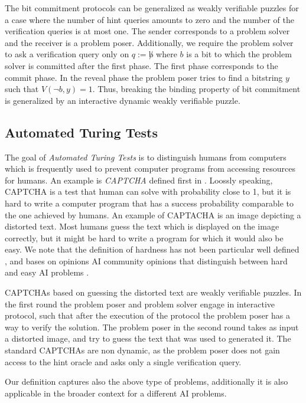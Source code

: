 \documentclass[11pt,a4paper,titlepage]{memoir}
\begin{document}
The bit commitment protocols can be generalized as weakly verifiable puzzles for a
case where the number of hint queries amounts to zero and the number of the verification queries is at most one.
The sender corresponds to a problem solver and the receiver is a problem poser.
Additionally, we require the problem solver to ask a verification query only on $q := \not b$ where $b$
is a bit to which the problem solver is committed after the first phase.
The first phase corresponds to the commit phase.
In the reveal phase the problem poser tries to find a bitstring $y$ such that $V(\lnot b, y) = 1$.
Thus, breaking the binding property of bit commitment is generalized by an interactive dynamic weakly verifiable puzzle.

\subsection{Automated Turing Tests}
The goal of \textit{Automated Turing Tests} is to distinguish humans from computers which
is frequently used to prevent computer programs from accessing resources for humans.
An example is \textit{CAPTCHA} defined first in \cite{von2003captcha}.
Loossly speaking, CAPTCHA is a test that human can solve with probability close to 1, but it is hard to write a computer program
that has a success probability comparable to the one achieved by humans.
An example of CAPTACHA is an image depicting a distorted text. Most humans guess the text which is displayed on the image correctly, but it might be hard to write
a program for which it would also be easy. We note that the definition of hardness has not been particular well defined ,
and bases on opinions AI community opinions that distinguish between hard and easy AI problems \cite{von2003captcha}.

CAPTCHAs based on guessing the distorted text are weakly verifiable puzzles.
In the first round the problem poser and problem solver engage in interactive protocol, such that
after the execution of the protocol the problem poser has a way to verify the solution.
The problem poser in the second round takes as input a distorted image, and try to guess the text that was used to generated it.
The standard CAPTCHAs are non dynamic, as the problem poser does not gain access to the hint oracle and
asks only a single verification query.

Our definition captures also the above type of problems, additionally it is also applicable in the broader context for a different
AI problems.
\end{document}
